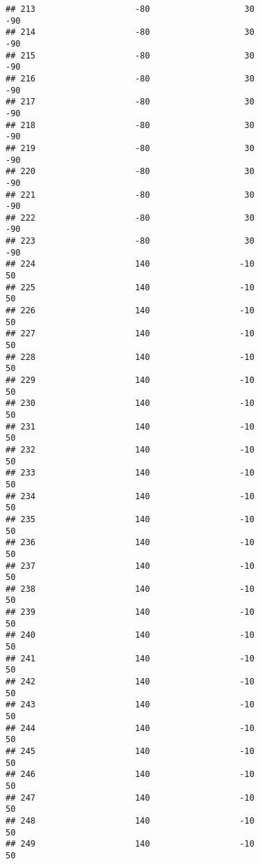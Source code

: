 \documentclass[]{article}
\begin{document}
\begin{verbatim}
## 213                    -80                   30                  -90
## 214                    -80                   30                  -90
## 215                    -80                   30                  -90
## 216                    -80                   30                  -90
## 217                    -80                   30                  -90
## 218                    -80                   30                  -90
## 219                    -80                   30                  -90
## 220                    -80                   30                  -90
## 221                    -80                   30                  -90
## 222                    -80                   30                  -90
## 223                    -80                   30                  -90
## 224                    140                  -10                   50
## 225                    140                  -10                   50
## 226                    140                  -10                   50
## 227                    140                  -10                   50
## 228                    140                  -10                   50
## 229                    140                  -10                   50
## 230                    140                  -10                   50
## 231                    140                  -10                   50
## 232                    140                  -10                   50
## 233                    140                  -10                   50
## 234                    140                  -10                   50
## 235                    140                  -10                   50
## 236                    140                  -10                   50
## 237                    140                  -10                   50
## 238                    140                  -10                   50
## 239                    140                  -10                   50
## 240                    140                  -10                   50
## 241                    140                  -10                   50
## 242                    140                  -10                   50
## 243                    140                  -10                   50
## 244                    140                  -10                   50
## 245                    140                  -10                   50
## 246                    140                  -10                   50
## 247                    140                  -10                   50
## 248                    140                  -10                   50
## 249                    140                  -10                   50

\end{verbatim}
\end{document}
